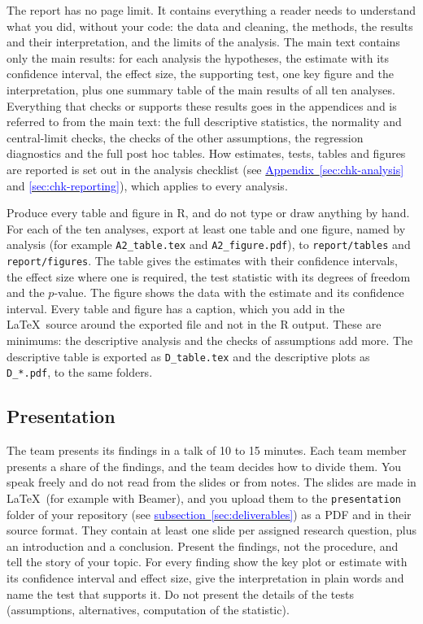 \documentclass[11pt,a4paper]{article}
\begin{document}
The report has no page limit. It contains everything a reader needs to understand what you did, without your code: the data and cleaning, the methods, the results and their interpretation, and the limits of the analysis. The main text contains only the main results: for each analysis the hypotheses, the estimate with its confidence interval, the effect size, the supporting test, one key figure and the interpretation, plus one summary table of the main results of all ten analyses. Everything that checks or supports these results goes in the appendices and is referred to from the main text: the full descriptive statistics, the normality and central-limit checks, the checks of the other assumptions, the regression diagnostics and the full post hoc tables. How estimates, tests, tables and figures are reported is set out in the analysis checklist (see \hyperref[sec:chk-analysis]{\textcolor{blue}{Appendix~\ref*{sec:chk-analysis}}} and \hyperref[sec:chk-reporting]{\textcolor{blue}{\ref*{sec:chk-reporting}}}), which applies to every analysis.

Produce every table and figure in R, and do not type or draw anything by hand. For each of the ten analyses, export at least one table and one figure, named by analysis (for example \texttt{A2\_table.tex} and \texttt{A2\_figure.pdf}), to \texttt{report/tables} and \texttt{report/figures}. The table gives the estimates with their confidence intervals, the effect size where one is required, the test statistic with its degrees of freedom and the $p$-value. The figure shows the data with the estimate and its confidence interval. Every table and figure has a caption, which you add in the \LaTeX\ source around the exported file and not in the R output. These are minimums: the descriptive analysis and the checks of assumptions add more. The descriptive table is exported as \texttt{D\_table.tex} and the descriptive plots as \texttt{D\_*.pdf}, to the same folders.

\subsection{Presentation}\label{sec:presentation}

The team presents its findings in a talk of 10 to 15 minutes. Each team member presents a share of the findings, and the team decides how to divide them. You speak freely and do not read from the slides or from notes. The slides are made in \LaTeX\ (for example with Beamer), and you upload them to the \texttt{presentation} folder of your repository (see \hyperref[sec:deliverables]{\textcolor{blue}{subsection~\ref*{sec:deliverables}}}) as a PDF and in their source format. They contain at least one slide per assigned research question, plus an introduction and a conclusion.
Present the findings, not the procedure, and tell the story of your topic. For every finding show the key plot or estimate with its confidence interval and effect size, give the interpretation in plain words and name the test that supports it. Do not present the details of the tests (assumptions, alternatives, computation of the statistic).
\end{document}
